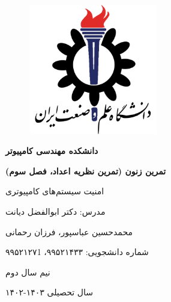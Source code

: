 \documentclass{article}
\begin{document}
\begin{titlepage}
    \centering
    \begin{figure}[ht]
        \centering
        \includegraphics[width=0.5\textwidth]{iust.png}
    \end{figure}
    \vspace{1cm}
    {\scshape\Huge \textbf{دانشکده مهندسی کامپیوتر} \par}
    \vspace{1cm}
    {\huge\bfseries تمرین زنون (تمرین نظریه اعداد، فصل سوم)  \par}
    \vspace{1cm}
    {\Large امنیت سیستم‌های کامپیوتری \par}
    \vspace{1cm}
	{\LARGE  مدرس: دکتر ابوالفضل دیانت\par}
    \vspace{1cm}
    {\LARGE  محمدحسین عباسپور، فرزان رحمانی \par}
    \vspace{1cm}
    {\LARGE شماره دانشجویی: ۹۹۵۲۱۴۳۳، ۹۹۵۲۱۲۷1 \par}
    \vspace{1.22cm}
    {\large نیم سال دوم \par}
    {\large سال تحصیلی ۱۴۰۳-۱۴۰۲ \par}
\end{titlepage}
\newpage
\doublespacing
\singlespacing
\newpage
\end{document}
